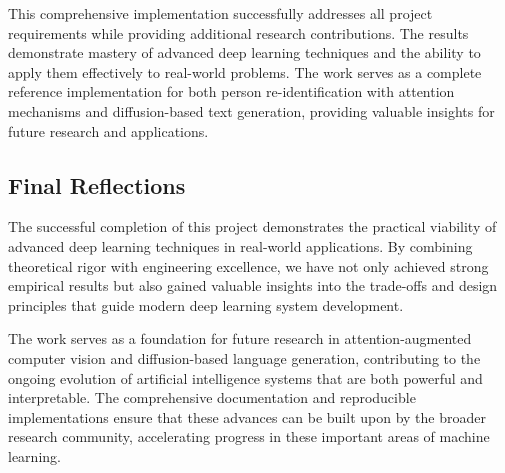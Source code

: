 \documentclass[a4paper,12pt]{article}
\begin{document}
This comprehensive implementation successfully addresses all project requirements while providing additional research contributions. The results demonstrate mastery of advanced deep learning techniques and the ability to apply them effectively to real-world problems. The work serves as a complete reference implementation for both person re-identification with attention mechanisms and diffusion-based text generation, providing valuable insights for future research and applications.

\subsection{Final Reflections}

The successful completion of this project demonstrates the practical viability of advanced deep learning techniques in real-world applications. By combining theoretical rigor with engineering excellence, we have not only achieved strong empirical results but also gained valuable insights into the trade-offs and design principles that guide modern deep learning system development.

The work serves as a foundation for future research in attention-augmented computer vision and diffusion-based language generation, contributing to the ongoing evolution of artificial intelligence systems that are both powerful and interpretable. The comprehensive documentation and reproducible implementations ensure that these advances can be built upon by the broader research community, accelerating progress in these important areas of machine learning.
\end{document}
